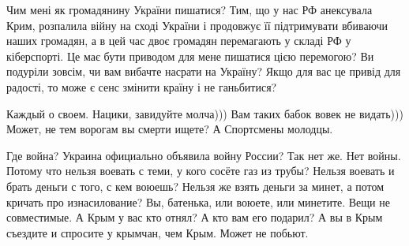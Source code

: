 \begin{cmtfront}

Чим мені як громадянину України пишатися? Тим, що у нас РФ анексувала Крим,
розпалила війну на сході України і продовжує її підтримувати вбиваючи наших
громадян, а в цей час двоє громадян перемагають у складі РФ у кіберспорті. Це
має бути приводом для мене пишатися цією перемогою? Ви подуріли зовсім, чи вам
вибачте насрати на Україну? Якщо для вас це привід для радості, то може є сенс
змінити країну і не ганьбитися?


Каждый о своем. Нацики, завидуйте молча))) Вам таких бабок вовек не видать)))
Может, не тем ворогам вы смерти ищете? А Спортсмены молодцы.


Где война? Украина официально объявила войну России? Так нет же. Нет войны.
Потому что нельзя воевать с теми, у кого сосёте газ из трубы? Нельзя воевать и
брать деньги с того, с кем воюешь? Нельзя же взять деньги за минет, а потом
кричать про изнасилование? Вы, батенька, или воюете, или минетите. Вещи не
совместимые. А Крым у вас кто отнял? А кто вам его подарил? А вы в Крым
съездите и спросите у крымчан, чем Крым. Может не побьют.
	
\end{cmtfront}

